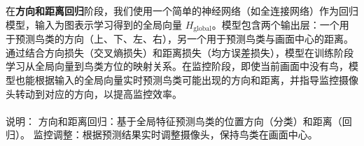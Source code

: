 \section{}
在\textbf{方向和距离回归}阶段，我们使用一个简单的神经网络（如全连接网络）作为回归模型，输入为图表示学习得到的全局向量 \( H_{\text{global}} \)。模型包含两个输出层：一个用于预测鸟类的方向（上、下、左、右），另一个用于预测鸟类与画面中心的距离。通过结合方向损失（交叉熵损失）和距离损失（均方误差损失），模型在训练阶段学习从全局向量到鸟类方位的映射关系。在监控阶段，即使当前画面中没有鸟，模型也能根据输入的全局向量实时预测鸟类可能出现的方向和距离，并指导监控摄像头转动到对应的方向，以提高监控效率。

\begin{figure}[h!]
\centering %
\end{figure}

\paragraph{}
说明：
方向和距离回归：基于全局特征预测鸟类的位置方向（分类）和距离（回归）。
监控调整：根据预测结果实时调整摄像头，保持鸟类在画面中心。